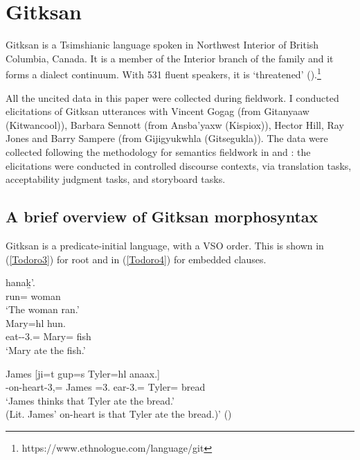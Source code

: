 \documentclass[output=paper]{langscibook}
\begin{document}
\section{Gitksan}\label{Todoro:sect2}

Gitksan is a Tsimshianic language spoken in Northwest Interior of British Columbia, Canada. It is a member of the Interior branch of the family and it forms a dialect continuum. With 531 fluent speakers, it is ‘threatened’ (\citealt{dunlop2018a}).\footnote{ https://www.ethnologue.com/language/git}

All the uncited data in this paper were collected during fieldwork. I conducted elicitations of Gitksan utterances with Vincent Gogag (from Gitanyaaw (Kitwancool)), Barbara Sennott (from Ansba’yaxw (Kispiox)), Hector Hill, Ray Jones and Barry Sampere (from Gijigyukwhla (Gitsegukla)). The data were collected following the methodology for semantics fieldwork in \citet{matthewson2004a} and \citet{burton2015a}: the elicitations were conducted in controlled discourse contexts, via translation tasks, acceptability judgment tasks, and storyboard tasks.

\subsection{A brief overview of Gitksan morphosyntax}

Gitksan is a predicate-initial language, with a VSO order. This is shown in (\ref{Todoro3}) for root and in (\ref{Todoro4}) for embedded clauses.

\begin{exe}
\ex \label{Todoro3}
\begin{xlist}

\ex \label{Todoro3a} 
 {hanak̲'.}\\
    run={\cn} woman\\
\glt `The woman ran.’ \citep[159]{davis2015a}\\

\ex \label{Todoro3b}
 {Mary=hl} {hun.}\\
    eat-{\tr}-3.{\seriesIII}={\dn} Mary={\cn} fish\\
\glt `Mary ate the fish.’ \citep[8]{forbes2019a} \\

\end{xlist}
\end{exe}

\begin{exe}
\ex \label{Todoro4}
 {James} [{ji=t} {gup=s} {Tyler=hl} {anaax.}] \\
{}-on-heart-3,{\seriesIII}={\dn} James {\irr}=3.{\seriesI} ear-3.{\seriesII}={\dn} Tyler={\cn} bread \\
\glt `James thinks that Tyler ate the bread.' \\ (Lit. James' on-heart is that Tyler ate the bread.)' (\citealt[57]{davis2011a})
\end{exe}
\end{document}
